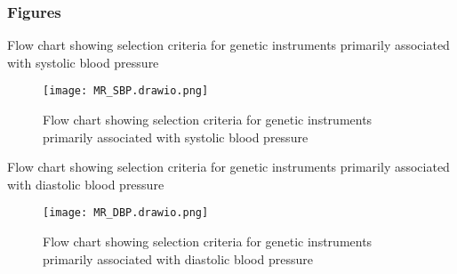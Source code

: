 \documentclass[11pt]{article}
\newcounter{subsubsubsection}[subsubsection]
\begin{document}
\subsubsection{Figures}

Flow chart showing selection criteria for genetic instruments primarily associated with systolic blood pressure
\begin{figure}[htbp]
  \centering
  \texttt{[image: MR\_SBP.drawio.png]}
  \caption{Flow chart showing selection criteria for genetic instruments primarily associated with systolic blood pressure }
  \label{fig:1}
\end{figure}

\color{black}
\newpage
{}

Flow chart showing selection criteria for genetic instruments primarily associated with diastolic blood pressure
\begin{figure}[htbp]
  \centering
  \texttt{[image: MR\_DBP.drawio.png]}
  \caption{Flow chart showing selection criteria for genetic instruments primarily associated with diastolic blood pressure }
  \label{fig:2}
\end{figure}
\color{black}
\newpage
{}
\end{document}
